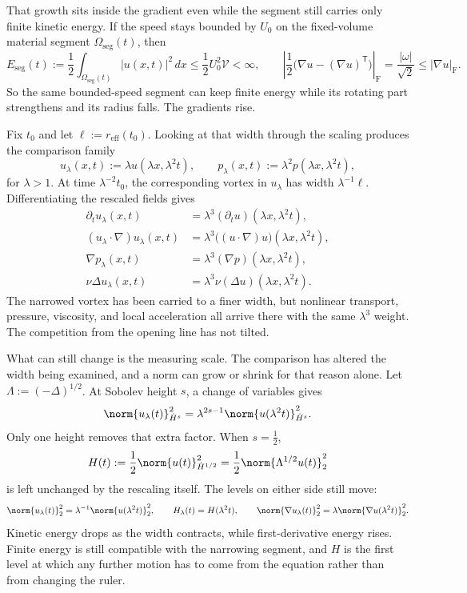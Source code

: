 That growth sits inside the gradient even while the segment still carries only finite kinetic energy. If the speed stays bounded by \(U_0\) on the fixed-volume material segment \(\Omega_{\mathrm{seg}}(t)\), then
\[
  E_{\mathrm{seg}}(t)
  :=
  \frac12\int_{\Omega_{\mathrm{seg}}(t)}|u(x,t)|^2\,dx
  \leq
  \frac12U_0^2\mathcal V
  <
  \infty,
  \qquad
  \left|\frac12\bigl(\nabla u-(\nabla u)^{\mathsf T}\bigr)\right|_{\mathrm F}
  =
  \frac{|\omega|}{\sqrt2}
  \leq
  |\nabla u|_{\mathrm F}.
\]
So the same bounded-speed segment can keep finite energy while its rotating part strengthens and its radius falls. The gradients rise.

Fix \(t_0\) and let \(\ell:=r_{\mathrm{eff}}(t_0)\). Looking at that width through the \NavierStokes{} scaling produces the comparison family
\[
  u_\lambda(x,t)
  :=
  \lambda u(\lambda x,\lambda^2t),
  \qquad
  p_\lambda(x,t)
  :=
  \lambda^2p(\lambda x,\lambda^2t),
\]
for \(\lambda>1\). At time \(\lambda^{-2}t_0\), the corresponding vortex in \(u_\lambda\) has width \(\lambda^{-1}\ell\). Differentiating the rescaled fields gives
\[
\begin{aligned}
  \partial_tu_\lambda(x,t)
  &=
  \lambda^3(\partial_tu)(\lambda x,\lambda^2t),
  \\
  (u_\lambda\cdot\nabla)u_\lambda(x,t)
  &=
  \lambda^3\bigl((u\cdot\nabla)u\bigr)(\lambda x,\lambda^2t),
  \\
  \nabla p_\lambda(x,t)
  &=
  \lambda^3(\nabla p)(\lambda x,\lambda^2t),
  \\
  \nu\Delta u_\lambda(x,t)
  &=
  \lambda^3\nu(\Delta u)(\lambda x,\lambda^2t).
\end{aligned}
\]
The narrowed vortex has been carried to a finer width, but nonlinear transport, pressure, viscosity, and local acceleration all arrive there with the same \(\lambda^3\) weight. The competition from the opening line has not tilted.

What can still change is the measuring scale. The comparison has altered the width being examined, and a norm can grow or shrink for that reason alone. Let \(\Lambda:=(-\Delta)^{1/2}\). At Sobolev height \(s\), a change of variables gives
\[
  \norm{u_\lambda(t)}_{\dot H^s}^2
  =
  \lambda^{2s-1}
  \norm{u(\lambda^2t)}_{\dot H^s}^2.
\]
Only one height removes that extra factor. When \(s=\tfrac12\),
\[
  H(t)
  :=
  \frac12\norm{u(t)}_{\dot H^{1/2}}^2
  =
  \frac12\norm{\Lambda^{1/2}u(t)}_2^2
\]
is left unchanged by the rescaling itself. The levels on either side still move:
\[
  \norm{u_\lambda(t)}_2^2
  =
  \lambda^{-1}\norm{u(\lambda^2t)}_2^2,
  \qquad
  H_\lambda(t)=H(\lambda^2t),
  \qquad
  \norm{\nabla u_\lambda(t)}_2^2
  =
  \lambda\norm{\nabla u(\lambda^2t)}_2^2.
\]
Kinetic energy drops as the width contracts, while first-derivative energy rises. Finite energy is still compatible with the narrowing segment, and \(H\) is the first level at which any further motion has to come from the equation rather than from changing the ruler.

